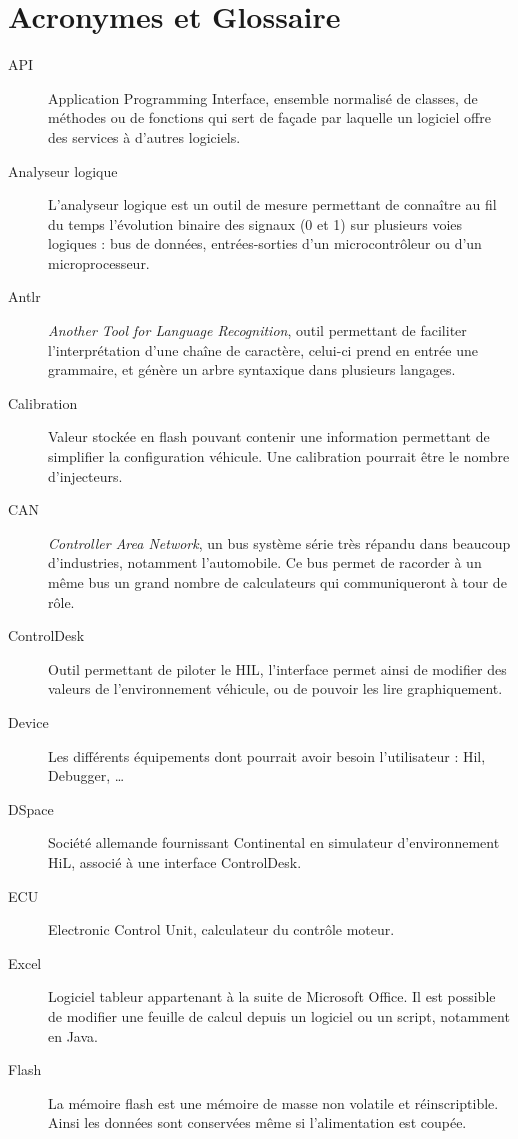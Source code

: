 \chapter{Acronymes et Glossaire}\label{glo}
\begin{description}
\item[API] Application Programming Interface, ensemble normalisé de classes, de méthodes ou de fonctions qui sert de façade par laquelle un
	logiciel offre des services à d'autres logiciels.
	\item[Analyseur logique] L'analyseur logique est un outil de mesure permettant de connaître au fil du temps l'évolution binaire des signaux (0 et 1) sur plusieurs voies logiques : bus de données, entrées-sorties d'un microcontrôleur ou d'un microprocesseur.
\item[Antlr] \textit{Another Tool for Language Recognition}, outil permettant de faciliter l'interprétation d'une chaîne de caractère, celui-ci prend en entrée une
	grammaire, et génère un arbre syntaxique dans plusieurs langages.
\item[Calibration] Valeur stockée en flash pouvant contenir une information permettant de simplifier la configuration véhicule. Une
	calibration pourrait être le nombre d'injecteurs.
\item[CAN] \textit{Controller Area Network}, un bus système série très répandu dans beaucoup d'industries, notamment l'automobile. Ce bus permet de racorder à un même bus un grand nombre de calculateurs qui communiqueront à tour de rôle.
\item[ControlDesk] Outil permettant de piloter le HIL, l'interface permet ainsi de modifier des valeurs de l'environnement véhicule, ou de
	pouvoir les lire graphiquement.
\item[Device] Les différents équipements dont pourrait avoir besoin l'utilisateur : Hil, Debugger, \ldots 
\item[DSpace] Société allemande fournissant Continental en simulateur d'environnement HiL, associé à une interface ControlDesk.
\item[ECU] Electronic Control Unit, calculateur du contrôle moteur.
\item[Excel] Logiciel tableur appartenant à la suite de Microsoft Office\textregistered. Il est possible de modifier une feuille de calcul depuis un logiciel ou un script, notamment en Java. 
\item[Flash] La mémoire flash est une mémoire de masse non volatile et réinscriptible. Ainsi les données sont conservées même si l'alimentation est coupée.

\end{description}
